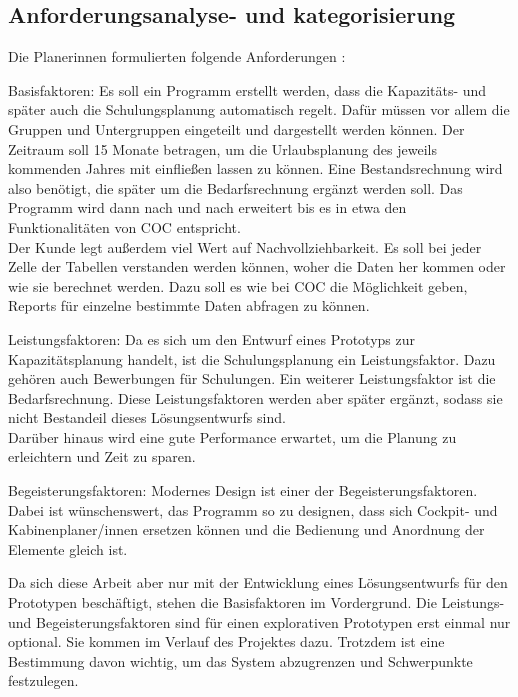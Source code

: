 \documentclass [12pt, a4paper, oneside, titlepage, ngerman]{article}
\begin{document}
\subsection{Anforderungsanalyse- und kategorisierung}
Die Planerinnen formulierten folgende Anforderungen \cite[vgl.]{Gespraech2}:
\begin{description}
\item Basisfaktoren: Es soll ein Programm erstellt werden, dass die Kapazitäts- und später auch die Schulungsplanung automatisch regelt. Dafür müssen vor allem die Gruppen und Untergruppen eingeteilt und dargestellt werden können. Der Zeitraum soll 15 Monate betragen, um die Urlaubsplanung des jeweils kommenden Jahres mit einfließen lassen zu können. Eine Bestandsrechnung wird also benötigt, die später um die Bedarfsrechnung ergänzt werden soll. Das Programm wird dann nach und nach erweitert bis es in etwa den Funktionalitäten von \ac{COC} entspricht. \\
Der Kunde legt außerdem viel Wert auf Nachvollziehbarkeit. Es soll bei jeder Zelle der Tabellen verstanden werden können, woher die Daten her kommen oder wie sie berechnet werden. Dazu soll es wie bei \ac{COC} die Möglichkeit geben, Reports für einzelne bestimmte Daten abfragen zu können.
\item Leistungsfaktoren: Da es sich um den Entwurf eines Prototyps zur Kapazitätsplanung handelt, ist die Schulungsplanung ein Leistungsfaktor. Dazu gehören auch Bewerbungen für Schulungen. Ein weiterer Leistungsfaktor ist die Bedarfsrechnung. Diese Leistungsfaktoren werden aber später ergänzt, sodass sie nicht Bestandeil dieses Lösungsentwurfs sind. \\
Darüber hinaus wird eine gute Performance erwartet, um die Planung zu erleichtern und Zeit zu sparen.
\item Begeisterungsfaktoren: Modernes Design ist einer der Begeisterungsfaktoren. Dabei ist wünschenswert, das Programm so zu designen, dass sich Cockpit- und Kabinenplaner/innen ersetzen können und die Bedienung und Anordnung der Elemente gleich ist. 
\end{description}
Da sich diese Arbeit aber nur mit der Entwicklung eines Lösungsentwurfs für den Prototypen beschäftigt, stehen die Basisfaktoren im Vordergrund. Die Leistungs- und Begeisterungsfaktoren sind für einen explorativen Prototypen erst einmal nur optional. Sie kommen im Verlauf des Projektes dazu. Trotzdem ist eine Bestimmung davon wichtig, um das System abzugrenzen und Schwerpunkte festzulegen.
\end{document}
